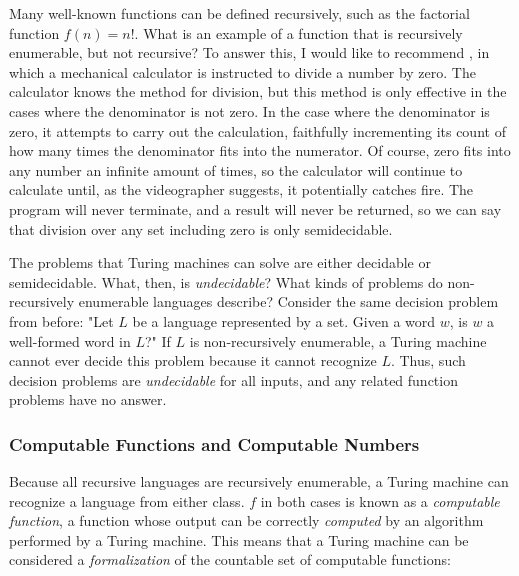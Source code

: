 \begin{tcolorbox}[breakable, enhanced, colback=textbook-blue, sharp corners]
	Many well-known functions can be defined recursively, such as the factorial function $f(n)=n!$. What is an example of a function that is recursively enumerable, but not recursive? To answer this, I would like to recommend , in which a mechanical calculator is instructed to divide a number by zero. The calculator knows the method for division, but this method is only effective in the cases where the denominator is not zero. In the case where the denominator is zero, it attempts to carry out the calculation, faithfully incrementing its count of how many times the denominator fits into the numerator. Of course, zero fits into any number an infinite amount of times, so the calculator will continue to calculate until, as the videographer suggests, it potentially catches fire. The program will never terminate, and a result will never be returned, so we can say that division over any set including zero is only semidecidable.
	\vspace{3mm}
\end{tcolorbox}
\vspace{2\baselineskip}

The problems that Turing machines can solve are either decidable or semidecidable. What, then, is \textit{undecidable}? What kinds of problems do non-recursively enumerable languages describe? Consider the same decision problem from before: "Let $L$ be a language represented by a set. Given a word $w$, is $w$ a well-formed word in $L$?" If $L$ is non-recursively enumerable, a Turing machine cannot ever decide this problem because it cannot recognize $L$. Thus, such decision problems are \textit{undecidable} for all inputs, and any related function problems have no answer. \\

\subsubsection{Computable Functions and Computable Numbers}

Because all recursive languages are recursively enumerable, a Turing machine can recognize a language from either class. $f$ in both cases is known as a \textit{computable function}, a function whose output can be correctly \textit{computed} by an algorithm performed by a Turing machine. This means that a Turing machine can be considered a \textit{formalization} of the countable set of computable functions:

